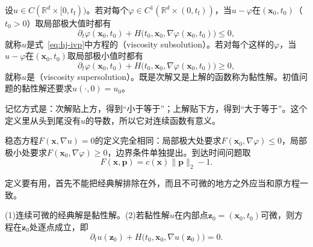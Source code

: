 \begin{definition}[黏性解]
\label{def:hj-viscosity}
设$u\in C(\mathbb{R}^{d}\times[0,t_{\mathrm{f}}))$。若对每个$\varphi\in C^1(\mathbb{R}^{d}\times(0,t_{\mathrm{f}}))$，当$u-\varphi$在$(\bm{x}_0,t_0)$（$t_0>0$）取局部极大值时都有
\begin{equation}
  \partial_t\varphi(\bm{x}_0,t_0)+H\bigl(t_0,\bm{x}_0,\nabla\varphi(\bm{x}_0,t_0)\bigr)\leq0,
  \label{eq:hj-subsolution}
\end{equation}
就称$u$是式~\eqref{eq:hj-ivp}中方程的（viscosity subsolution）。若对每个这样的$\varphi$，当$u-\varphi$在$(\bm{x}_0,t_0)$取局部极小值时都有
\begin{equation}
  \partial_t\varphi(\bm{x}_0,t_0)+H\bigl(t_0,\bm{x}_0,\nabla\varphi(\bm{x}_0,t_0)\bigr)\geq0,
  \label{eq:hj-supersolution}
\end{equation}
就称$u$是（viscosity supersolution）。既是次解又是上解的函数称为黏性解。初值问题的黏性解还要求$u(\cdot,0)=u_0$。
\end{definition}

记忆方式是：次解贴上方，得到“小于等于”；上解贴下方，得到“大于等于”。这个定义里从头到尾没有$u$的导数，所以它对连续函数有意义。

稳态方程$F(\bm{x},\nabla u)=0$的定义完全相同：局部极大处要求$F(\bm{x}_0,\nabla\varphi)\leq0$，局部极小处要求$F(\bm{x}_0,\nabla\varphi)\geq0$，边界条件单独提出。到达时间问题取
\[
  F(\bm{x},\bm{p})=c(\bm{x})\lVert\bm{p}\rVert_2-1.
\]

定义要有用，首先不能把经典解排除在外，而且不可微的地方之外应当和原方程一致。

\begin{lemma}[与经典解相容]
\label{lem:hj-consistency}
(1)连续可微的经典解是黏性解。(2)若黏性解$u$在内部点$\bm{z}_0=(\bm{x}_0,t_0)$可微，则方程在$\bm{z}_0$处逐点成立，即
\begin{equation}
  \partial_tu(\bm{z}_0)+H\bigl(t_0,\bm{x}_0,\nabla u(\bm{z}_0)\bigr)=0.
  \label{eq:hj-consistency}
\end{equation}
\end{lemma}

